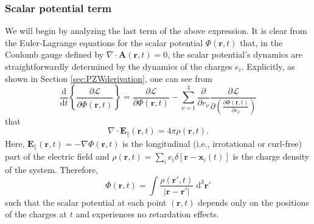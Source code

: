 \documentclass{article}
\begin{document}
\subsubsection{Scalar potential term}

We will begin by analyzing the last term of the above expression. It is clear from the Euler-Lagrange equations for the scalar potential $\Phi(\mathbf{r},t)$ that, in the Coulomb gauge defined by $\nabla\cdot\mathbf{A}(\mathbf{r},t) = 0$, the scalar potential's dynamics are straightforwardly determined by the dynamics of the charges $e_i$. Explicitly, as shown in Section \ref{sec:PZWderivation}, one can see from
\begin{equation}
\frac{\mathrm{d}}{\mathrm{d}t}\left\{\frac{\partial \mathcal{L}}{\partial \dot{\Phi}(\mathbf{r},t)}\right\} = \frac{\partial \mathcal{L}}{\partial \Phi(\mathbf{r},t)} - \sum_{\nu = 1}^3\frac{\partial}{\partial r_\nu}\frac{\partial \mathcal{L}}{\partial\!\left(\frac{\partial \Phi(\mathbf{r},t)}{\partial r_\nu}\right)}
\end{equation}
that
\begin{equation}
\nabla\cdot\mathbf{E}_\parallel(\mathbf{r},t) = 4\pi\rho(\mathbf{r},t).
\end{equation}
Here, $\mathbf{E}_\parallel(\mathbf{r},t) = -\nabla\Phi(\mathbf{r},t)$ is the longitudinal (i.e., irrotational or curl-free) part of the electric field and $\rho(\mathbf{r},t) = \sum_ie_i\delta[\mathbf{r} - \mathbf{x}_i(t)]$ is the charge density of the system. Therefore, 
\begin{equation}
\Phi(\mathbf{r},t) = \int\frac{\rho(\mathbf{r}',t)}{|\mathbf{r} - \mathbf{r}'|}\;\mathrm{d}^3\mathbf{r}'
\end{equation}
such that the scalar potential at each point $(\mathbf{r},t)$ depends only on the positions of the charges at $t$ and experiences no retardation effects.
\end{document}
